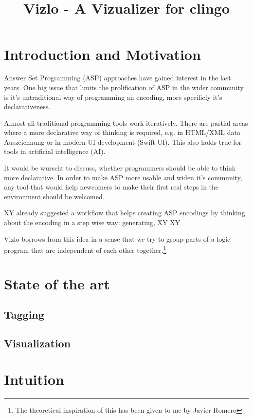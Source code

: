 
\title{Vizlo - A Vizualizer for clingo}

\section{Introduction and Motivation}

Answer Set Programming (ASP) approaches have gained interest in the last years. One big issue that limits the prolification of ASP in the wider community is it's untraditional way of programming an encoding, more specificly it's declarativeness.

Almost all traditional programming tools work iteratively. There are partial areas where a more declarative way of thinking is required, e.g. in HTML/XML data Auszeichnung or in modern UI development (Swift UI). This also holds true for tools in artificial intelligence (AI). %

It would be wurscht to discuss, whether programmers should be able to think more declarative. In order to make ASP more usable and widen it's community, any tool that would help newcomers to make their first real steps in the environment should be welcomed. 

XY already suggested a workflow that helps creating ASP encodings by thinking about the encoding in a step wise way: generating, XY XY %

Vizlo borrows from this idea in a sense that we try to group parts of a logic program that are independent of each other together.\footnote{The theoretical inspiration of this has been given to me by Javier Romero}


\section{State of the art}

\subsection{Tagging}

\subsection{Visualization}


\section{Intuition}

